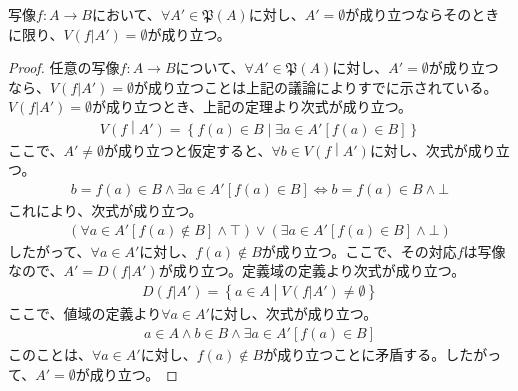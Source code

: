 \documentclass[dvipdfmx]{jsarticle}
\begin{document}
\begin{thm}
\label{1.2.3.6}
写像$f:A \rightarrow B$において、$\forall A'\in \mathfrak{P}(A)$に対し、$A' = \emptyset$が成り立つならそのときに限り、$V\left( f|A' \right) = \emptyset$が成り立つ。
\end{thm}
\begin{proof}
任意の写像$f:A \rightarrow B$について、$\forall A'\in \mathfrak{P}(A)$に対し、$A' = \emptyset$が成り立つなら、$V\left( f|A' \right) = \emptyset$が成り立つことは上記の議論によりすでに示されている。$V\left( f|A' \right) = \emptyset$が成り立つとき、上記の定理より次式が成り立つ。
\begin{align*}
V\left( f \middle| A' \right) = \left\{ f(a) \in B \middle| \exists a \in A'\left[ f(a) \in B \right] \right\}
\end{align*}
ここで、$A' \neq \emptyset$が成り立つと仮定すると、$\forall b \in V\left( f \middle| A' \right)$に対し、次式が成り立つ。
\begin{align*}
b = f(a) \in B \land \exists a \in A'\left[ f(a) \in B \right] \Leftrightarrow b = f(a) \in B \land \bot
\end{align*}
これにより、次式が成り立つ。
\begin{align*}
\left( \forall a \in A'\left[ f(a) \notin B \right] \land \top \right) \vee \left( \exists a \in A'\left[ f(a) \in B \right] \land \bot \right)
\end{align*}
したがって、$\forall a \in A'$に対し、$f(a) \notin B$が成り立つ。ここで、その対応$f$は写像なので、$A' = D\left( f|A' \right)$が成り立つ。定義域の定義より次式が成り立つ。
\begin{align*}
D\left( f|A' \right) = \left\{ a \in A \middle| V\left( f|A' \right) \neq \emptyset \right\}
\end{align*}
ここで、値域の定義より$\forall a \in A'$に対し、次式が成り立つ。
\begin{align*}
a \in A \land b \in B \land \exists a \in A'\left[ f(a) \in B \right]
\end{align*}
このことは、$\forall a \in A'$に対し、$f(a) \notin B$が成り立つことに矛盾する。したがって、$A' = \emptyset$が成り立つ。
\end{proof}
\end{document}
